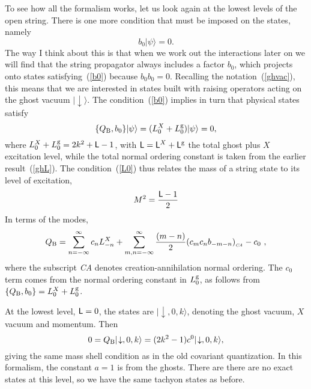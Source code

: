 To see how all the formalism works, let us look again at the lowest
levels of the open string.  There is one more condition that must be
imposed on the states, namely
\begin{equation}
b_0 | \psi \rangle = 0. \label{b0}
\end{equation}
The way I think about this is that when we work out the interactions later
on we will find that the string propagator always includes a factor $b_0$,
which projects onto states 
satisfying~(\ref{b0})
because $b_0 b_0 = 0$.  Recalling the notation~(\ref{ghvac}), this
means that we are interested in states built with raising operators
acting on the ghost vacuum $|\! \downarrow \rangle$. The
condition~(\ref{b0}) implies in turn that physical states satisfy
\begin{equation}
\{Q_{\rm B}, b_0\} | \psi \rangle = 
(L^{X}_0 + L^{\rm g}_0) | \psi \rangle = 0, \label{L0}
\end{equation}
where $L^{X}_0 + L^{\rm g}_0 
= 2k^2 + {\sf L} - 1$,
with ${\sf L} = {\sf L}^{X } + {\sf L}^{\rm g}$
the total ghost plus $X$ excitation
level, while the total normal ordering constant is taken from the
earlier result~(\ref{ghL}).  The condition~(\ref{L0}) thus relates
the mass of a string state to its level of excitation, 
\begin{equation}
M^2 = \frac{ {\sf L} - 1 }{2}
\label{mshell}
\end{equation}
In terms of the modes,
\begin{equation}
Q_{\rm B} =
 \sum_{n= -\infty}^{\infty} c_n L^X_{-n} +
\sum_{m,n=-\infty}^{\infty}\frac{(m-n)}{2}
( c_m c_n b_{-m-n} )_{{}_{\it CA}}
- c_0\ , \label{qex}
\end{equation}
where the subscript {\it CA} denotes creation-annihilation normal
ordering.  The $c_0$ term comes from the normal ordering
constant in $L_0^{\rm g}$, as follows from $\{Q_{\rm B}, b_0
\} = L^{X}_0 + L^{\rm g}_0$.

At the lowest level, ${\sf L}=0$, the states are $|\! \downarrow, 0, k
\rangle$, denoting the ghost vacuum, $X$ vacuum and momentum. 
Then
\begin{equation}
0 = Q_{\rm B} |\! \downarrow, 0, k \rangle = (2k^2 - 1)
c^0 |\! \downarrow, 0, k \rangle ,
\end{equation}
giving the same mass shell condition as in the old covariant
quantization.  In this formalism, the constant $a = 1$ is from the
ghosts.  There are
there are no exact states at this level,
so we have the same tachyon states as before.

